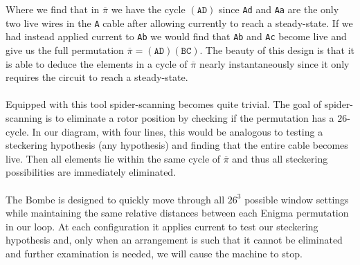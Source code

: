 \begin{center}
\end{center}
Where we find that in $\overline\pi$ we have the cycle $(\texttt{AD})$
since \texttt{Ad} and \texttt{Aa} are the only two live
wires in the \texttt{A} cable after allowing currently to reach a
steady-state. If we had instead applied current to \texttt{Ab} we would find
that \texttt{Ab} and \texttt{Ac} become live and give us the full
permutation $\overline\pi = (\texttt{AD})(\texttt{BC})$. The beauty
of this design
is that it is able to deduce the elements in a cycle of
$\overline\pi$ nearly instantaneously since it only requires the
circuit to reach
a steady-state.
\\\\Equipped with this tool spider-scanning becomes quite trivial.
The goal of spider-scanning is to eliminate a rotor position by
checking if the permutation has a $26$-cycle. In our diagram, with four lines,
this would be analogous to testing a steckering hypothesis (any
hypothesis) and finding that the entire cable becomes live. Then all
elements lie within the same cycle of $\overline\pi$ and thus all
steckering possibilities are immediately eliminated.
\\\\The Bombe is designed to quickly move through all $26^3$ possible
window settings while maintaining the same relative distances between
each Enigma permutation in our loop. At each configuration
it applies current to test our steckering hypothesis and, only when
an arrangement is such that it
cannot be eliminated and further examination is needed, we will cause
the machine to stop.

